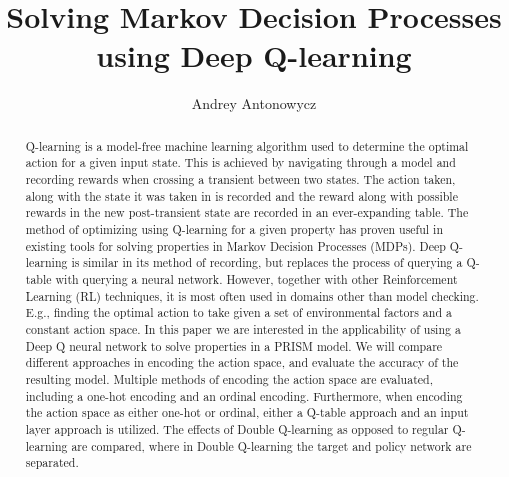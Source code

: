 \documentclass[runningheads]{llncs}
\begin{document}
%
\title{Solving Markov Decision Processes using Deep Q-learning}
%
%
\author{Andrey Antonowycz}
%
%
%
\maketitle %
%
\begin{abstract}
Q-learning is a model-free machine learning algorithm used to determine the optimal action for a given input state. This is achieved by navigating through a model and recording rewards when crossing a transient between two states. The action taken, along with the state it was taken in is recorded and the reward along with possible rewards in the new post-transient state are recorded in an ever-expanding table. The method of optimizing using Q-learning for a given property has proven useful in existing tools \cite{modest} for solving properties in Markov Decision Processes (MDPs). Deep Q-learning is similar in its method of recording, but replaces the process of querying a Q-table with querying a neural network. However, together with other Reinforcement Learning (RL) techniques, it is most often used in domains other than model checking. E.g., finding the optimal action to take given a set of environmental factors and a constant action space. In this paper we are interested in the applicability of using a Deep Q neural network to solve properties in a PRISM model. We will compare different approaches in encoding the action space, and evaluate the accuracy of the resulting model. Multiple methods of encoding the action space are evaluated, including a one-hot encoding and an ordinal encoding. Furthermore, when encoding the action space as either one-hot or ordinal, either a Q-table approach and an input layer approach is utilized. The effects of Double Q-learning as opposed to regular Q-learning are compared, where in Double Q-learning the target and policy network are separated.

\end{abstract}
%
%
%
\newpage







\end{document}
